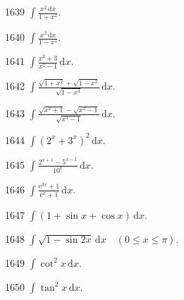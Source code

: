 \begin{prob}[S]{1639}
$\displaystyle\int \frac{x^2 \,\mathrm{d}x}{1 + x^2}.$
\end{prob}

\begin{prob}[S]{1640}
$\displaystyle\int \frac{x^2 \,\mathrm{d}x}{1 - x^2}.$
\end{prob}

\begin{prob}[S]{1641}
$\displaystyle\int \frac{x^2 + 3}{x^2 - 1} \,\mathrm{d}x.$
\end{prob}

\begin{prob}[S]{1642}
$\displaystyle\int \frac{\sqrt{1 + x^2} + \sqrt{1 - x^2}}{\sqrt{1 - x^4}} \,\mathrm{d}x.$
\end{prob}

\begin{prob}[S]{1643}
$\displaystyle\int \frac{\sqrt{x^2 + 1} - \sqrt{x^2 - 1}}{\sqrt{x^4 - 1}} \,\mathrm{d}x.$
\end{prob}

\begin{prob}[S]{1644}
$\displaystyle\int (2^x + 3^x)^2 \,\mathrm{d}x.$
\end{prob}

\begin{prob}[S]{1645}
$\displaystyle\int \frac{2^{x+1} - 5^{x-1}}{10^x} \,\mathrm{d}x.$
\end{prob}

\begin{prob}[S]{1646}
$\displaystyle\int \frac{\mathrm{e}^{3x} + 1}{\mathrm{e}^x + 1} \,\mathrm{d}x.$
\end{prob}

\begin{prob}[S]{1647}
$\displaystyle\int (1 + \sin x + \cos x) \,\mathrm{d}x.$
\end{prob}

\begin{prob}[S]{1648}
$\displaystyle\int \sqrt{1 - \sin 2x} \,\mathrm{d}x \quad (0 \leqslant x \leqslant \pi).$
\end{prob}

\begin{prob}[S]{1649}
$\displaystyle\int \cot^2 x \,\mathrm{d}x.$
\end{prob}

\begin{prob}[S]{1650}
$\displaystyle\int \tan^2 x \,\mathrm{d}x.$
\end{prob}

